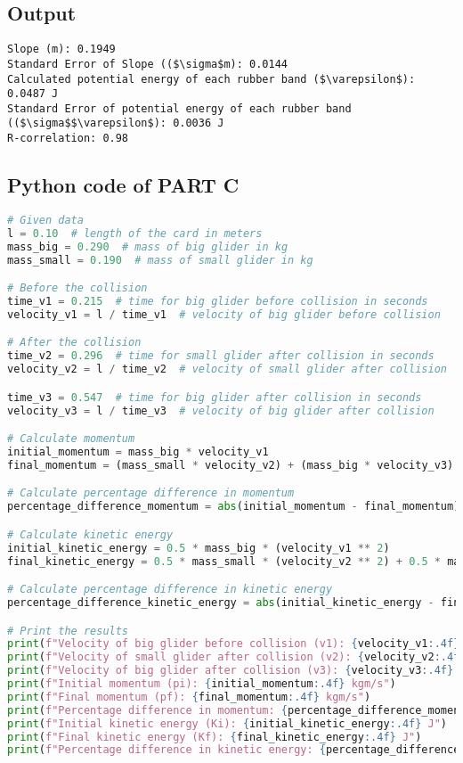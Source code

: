 \documentclass[a4paper,11pt]{article}
\begin{document}
\subsection*{Output}
\begin{lstlisting}
Slope (m): 0.1949
Standard Error of Slope (($\sigma$m): 0.0144
Calculated potential energy of each rubber band ($\varepsilon$): 0.0487 J
Standard Error of potential energy of each rubber band (($\sigma$$\varepsilon$): 0.0036 J
R-correlation: 0.98
\end{lstlisting}
\newpage
\subsection*{Python code of PART C}
\begin{lstlisting}[language=Python]
# Given data
l = 0.10  # length of the card in meters
mass_big = 0.290  # mass of big glider in kg
mass_small = 0.190  # mass of small glider in kg

# Before the collision
time_v1 = 0.215  # time for big glider before collision in seconds
velocity_v1 = l / time_v1  # velocity of big glider before collision

# After the collision
time_v2 = 0.296  # time for small glider after collision in seconds
velocity_v2 = l / time_v2  # velocity of small glider after collision

time_v3 = 0.547  # time for big glider after collision in seconds
velocity_v3 = l / time_v3  # velocity of big glider after collision

# Calculate momentum
initial_momentum = mass_big * velocity_v1
final_momentum = (mass_small * velocity_v2) + (mass_big * velocity_v3)

# Calculate percentage difference in momentum
percentage_difference_momentum = abs(initial_momentum - final_momentum) / ((initial_momentum + final_momentum) / 2) * 100

# Calculate kinetic energy
initial_kinetic_energy = 0.5 * mass_big * (velocity_v1 ** 2)
final_kinetic_energy = 0.5 * mass_small * (velocity_v2 ** 2) + 0.5 * mass_big * (velocity_v3 ** 2)

# Calculate percentage difference in kinetic energy
percentage_difference_kinetic_energy = abs(initial_kinetic_energy - final_kinetic_energy) / ((initial_kinetic_energy + final_kinetic_energy) / 2) * 100

# Print the results
print(f"Velocity of big glider before collision (v1): {velocity_v1:.4f} m/s")
print(f"Velocity of small glider after collision (v2): {velocity_v2:.4f} m/s")
print(f"Velocity of big glider after collision (v3): {velocity_v3:.4f} m/s")
print(f"Initial momentum (pi): {initial_momentum:.4f} kgm/s")
print(f"Final momentum (pf): {final_momentum:.4f} kgm/s")
print(f"Percentage difference in momentum: {percentage_difference_momentum:.2f}%")
print(f"Initial kinetic energy (Ki): {initial_kinetic_energy:.4f} J")
print(f"Final kinetic energy (Kf): {final_kinetic_energy:.4f} J")
print(f"Percentage difference in kinetic energy: {percentage_difference_kinetic_energy:.2f}%")
\end{lstlisting}
\end{document}
